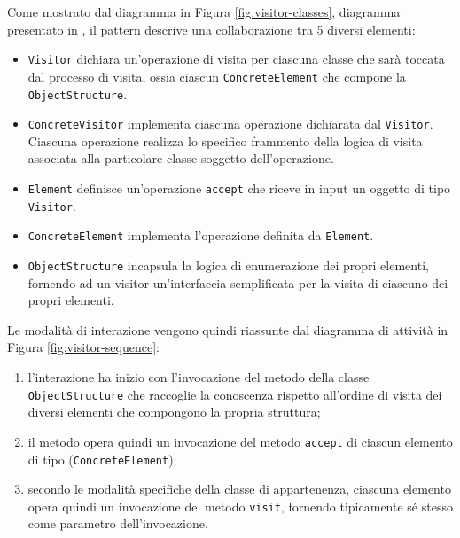 Come mostrato dal diagramma in Figura \ref{fig:visitor-classes}, diagramma
presentato in \cite{gamma1995design}, il pattern descrive una collaborazione tra
5 diversi elementi:

\begin{itemize}

\item \texttt{Visitor} dichiara un'operazione di visita per ciascuna classe che
sarà toccata dal processo di visita, ossia ciascun \texttt{ConcreteElement} che
compone la \texttt{ObjectStructure}.

\item \texttt{ConcreteVisitor} implementa ciascuna operazione dichiarata dal
\texttt{Visitor}. Ciascuna operazione realizza lo specifico frammento della
logica di visita associata alla particolare classe soggetto dell'operazione.

\item \texttt{Element} definisce un'operazione \texttt{accept} che riceve in
input un oggetto di tipo \texttt{Visitor}.

\item \texttt{ConcreteElement} implementa l'operazione definita da \texttt
{Element}.

\item \texttt{ObjectStructure} incapsula la logica di enumerazione dei propri
elementi, fornendo ad un visitor un'interfaccia semplificata per la visita di
ciascuno dei propri elementi.

\end{itemize}

Le modalità di interazione vengono quindi riassunte dal diagramma di attività
in Figura \ref{fig:visitor-sequence}:

\begin{enumerate}

\item l'interazione ha inizio con l'invocazione del metodo della classe
\texttt{ObjectStructure} che raccoglie la conoscenza rispetto all'ordine di
visita dei diversi elementi che compongono la propria struttura;

\item il metodo opera quindi un invocazione del metodo \texttt{accept} di
ciascun elemento di tipo (\texttt{ConcreteElement});

\item secondo le modalità specifiche della classe di appartenenza, ciascuna
elemento opera quindi un invocazione del metodo \texttt{visit}, fornendo
tipicamente sé stesso come parametro dell'invocazione.

\end{enumerate}

